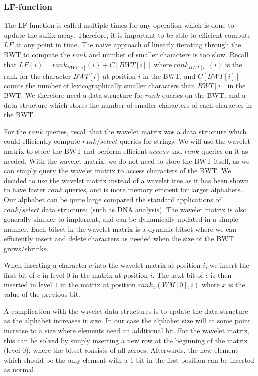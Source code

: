\subsubsection{LF-function}

The LF function is called multiple times for any operation which is done to update the
suffix array. Therefore, it is important to be able to efficient compute $LF$ at any point
in time. The naive approach of linearly iterating through the BWT to compute the $rank$
and number of smaller characters is too slow. Recall that $LF(i) = rank_{BWT[i]}(i) +
C[BWT[i]]$ where $rank_{BWT[i]}(i)$ is the rank for the character $BWT[i]$ at position $i$
in the BWT, and $C[BWT[i]]$ counts the number of lexicographically smaller characters than
$BWT[i]$ in the BWT. We therefore need a data structure for $rank$ queries on the BWT, and
a data structure which stores the number of smaller characters of each character in the
BWT. 

For the $rank$ queries, recall that the wavelet matrix was a data structure which could
efficiently compute $rank/select$ queries for strings. We will use the wavelet matrix to
store the BWT and perform efficient $access$ and $rank$ queries on it as needed. With the
wavelet matrix, we do not need to store the BWT itself, as we can simply query the wavelet
matrix to access characters of the BWT. We decided to use the wavelet matrix instead of a
wavelet tree as it has been shown to have faster $rank$ queries, and is more memory
efficient for larger alphabets. Our alphabet can be quite large compared the standard
applications of $rank/select$ data structures (such as DNA analysis). The wavelet matrix
is also generally simpler to implement, and can be dynamically updated in a simple manner.
Each bitset in the wavelet matrix is a dynamic bitset where we can efficiently insert and
delete characters as needed when the size of the BWT grows/shrinks.

When inserting a character $c$ into the wavelet matrix at position $i$, we insert the
first bit of $c$ in level $0$ in the matrix at position $i$. The next bit of $c$ is then
inserted in level $1$ in the matrix at position $rank_x(WM[0], i)$ where $x$ is the value
of the previous bit.

A complication with the wavelet data structures is to update the data structure as the
alphabet increases in size. In our case the alphabet size will at some point increase to a
size where elements need an additional bit. For the wavelet matrix, this can be solved by
simply inserting a new row at the beginning of the matrix (level $0$), where the bitset
consists of all zeroes. Afterwards, the new element which should be the only element with
a $1$ bit in the first position can be inserted as normal.

